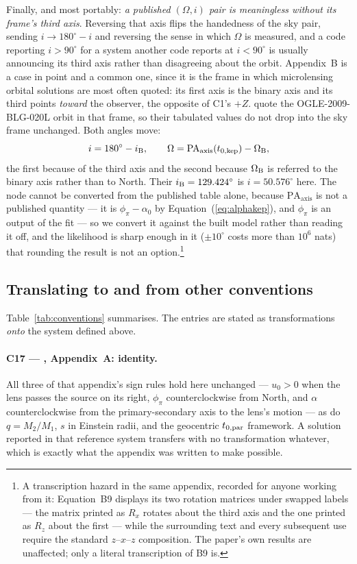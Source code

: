 Finally, and most portably: \emph{a published $(\Omega, i)$ pair is
meaningless without its frame's third axis}.  Reversing that axis flips the
handedness of the sky pair, sending $i \rightarrow 180^\circ - i$ and
reversing the sense in which $\Omega$ is measured, and a code reporting
$i > 90^\circ$ for a system another code reports at $i < 90^\circ$ is
usually announcing its third axis rather than disagreeing about the orbit.
\citet{Skowron:2011} Appendix~B is a case in point and a common one, since
it is the frame in which microlensing orbital solutions are most often
quoted: its first axis is the binary axis and its third points
\emph{toward} the observer, the opposite of C1's $+Z$.  \citet{Yee:2016}
quote the OGLE-2009-BLG-020L orbit in that frame, so their tabulated values
do not drop into the sky frame unchanged.  Both angles move:
\begin{equation}
  i = 180^\circ - i_{\rm B}, \qquad
  \Omega = \mathrm{PA_{axis}}(t_{0,\rm kep}) - \Omega_{\rm B},
  \label{eq:appb}
\end{equation}
the first because of the third axis and the second because $\Omega_{\rm B}$
is referred to the binary axis rather than to North.  Their $i_{\rm B} =
129.424^\circ$ is $i = 50.576^\circ$ here.  The node cannot be converted
from the published table alone, because $\mathrm{PA_{axis}}$ is not a
published quantity --- it is $\phi_\pi - \alpha_0$ by
Equation~(\ref{eq:alphakep}), and $\phi_\pi$ is an output of the fit --- so
we convert it against the built model rather than reading it off, and the
likelihood is sharp enough in it ($\pm 10^\circ$ costs more than
$10^6$ nats) that rounding the result is not an option.\footnote{A
transcription hazard in the same appendix, recorded for anyone working from
it: Equation~B9 displays its two rotation matrices under swapped labels ---
the matrix printed as $R_x$ rotates about the third axis and the one
printed as $R_z$ about the first --- while the surrounding text and every
subsequent use require the standard $z$--$x$--$z$ composition.  The paper's
own results are unaffected; only a literal transcription of B9 is.}
\subsection{Translating to and from other conventions}
\label{sec:conv:mappings}

Table~\ref{tab:conventions} summarises.  The entries are stated as
transformations \emph{onto} the system defined above.

\paragraph{C17 --- \citet{Skowron:2011}, Appendix~A: identity.}  All three
of that appendix's sign rules hold here unchanged --- $u_0 > 0$ when the
lens passes the source on its right, $\phi_\pi$ counterclockwise from North,
and $\alpha$ counterclockwise from the primary-secondary axis to the lens's
motion --- as do $q = M_2/M_1$, $s$ in Einstein radii, and the geocentric
$t_{0,\rm par}$ framework.  A solution reported in that reference system
transfers with no transformation whatever, which is exactly what the
appendix was written to make possible.

